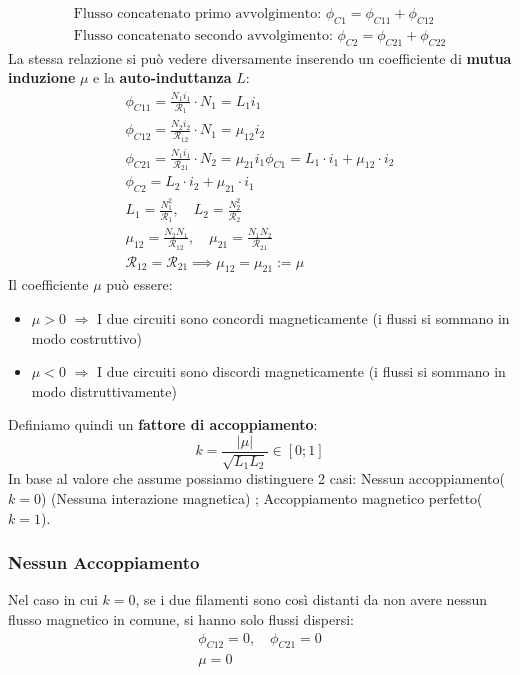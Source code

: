 \documentclass[../main.tex]{subfiles}
\begin{document}
	\begin{gather}
		\text{Flusso concatenato primo avvolgimento: }\phi_{C1}=\phi_{C11}+\phi_{C12} \\
		\text{Flusso concatenato secondo avvolgimento: }\phi_{C2}=\phi_{C21}+\phi_{C22}
	\end{gather}
	La stessa relazione si può vedere diversamente inserendo un coefficiente di \textbf{mutua induzione} $\mu$ e la \textbf{auto-induttanza} $L$:
	\begin{gather}
		\phi_{C11}=\frac{N_1i_1}{\mathscr{R}_1}\cdot N_1 = L_1 i_1 \\
		\phi_{C12}=\frac{N_2i_2}{\mathscr{R}_{12}}\cdot N_1=\mu_{12}i_2 \\
		\phi_{C21}=\frac{N_1i_1}{\mathscr{R}_{21}}\cdot N_2=\mu_{21}i_1
		\phi_{C1}=L_1\cdot i_1+\mu_{12}\cdot i_2 \\
		\phi_{C2}=L_2\cdot i_2+\mu_{21}\cdot i_1 \\
		L_1=\frac{N_1^2}{\mathscr{R}_1}, \quad L_2=\frac{N_2^2}{\mathscr{R}_2} \\
		\mu_{12}=\frac{N_2N_1}{\mathscr{R}_{12}}, \quad \mu_{21}=\frac{N_1N_2}{\mathscr{R}_{21}} \\
		\mathscr{R}_{12}=\mathscr{R}_{21}\implies \mu_{12}=\mu_{21}:=\mu
	\end{gather}
	Il coefficiente $\mu$ può essere:
	\begin{itemize}
		\item $\mu > 0$ $\Rightarrow$ I due circuiti sono concordi magneticamente (i flussi si sommano in modo costruttivo)
		\item $\mu < 0$ $\Rightarrow$ I due circuiti sono discordi magneticamente (i flussi si sommano in modo distruttivamente)
	\end{itemize}
	Definiamo quindi un \textbf{fattore di accoppiamento}:
	\begin{equation}
		k = \frac{\left| \mu \right|}{\sqrt{L_1 L_2}} \in \left[ 0;1 \right]
	\end{equation}
	In base al valore che assume possiamo distinguere 2 casi: Nessun accoppiamento($k=0$) (Nessuna interazione magnetica) ; Accoppiamento magnetico perfetto($k=1$).
	\subsubsection{Nessun Accoppiamento}
	Nel caso in cui $k=0$, se i due filamenti sono così distanti da non avere nessun flusso magnetico in comune, si hanno solo flussi dispersi:
	\begin{gather}
		\phi_{C12}=0, \quad \phi_{C21}=0 \\
		\mu=0
	\end{gather}
\end{document}

